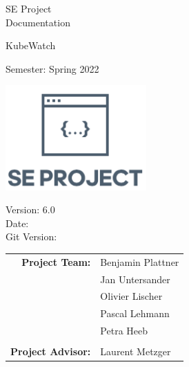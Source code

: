 \begin{titlepage}

    \begin{center}


        \vspace{1 cm}

        {\Large SE Project \\ Documentation} \\

        \vspace{0.5cm}

        {\Huge KubeWatch}

        \vspace{0.5cm}

        Semester: Spring 2022

        \vspace{0.5 cm}

        \includegraphics[height=4cm]{resources/se-project-logo.png}

        \vspace{0.5 cm}

        Version: 6.0 \\
        Date: \DTMnow \\
        Git Version: \gitDescription
        \vspace{1 cm}

        \begin{tabular}{rl}
            \textbf{Project Team:}    & Benjamin Plattner \\
                                      & Jan Untersander \\
                                      & Olivier Lischer \\
                                      & Pascal Lehmann \\
                                      & Petra Heeb \\
                                      &                    \\
            \textbf{Project Advisor:} & Laurent Metzger
        \end{tabular}


\end{center}
\end{titlepage}
